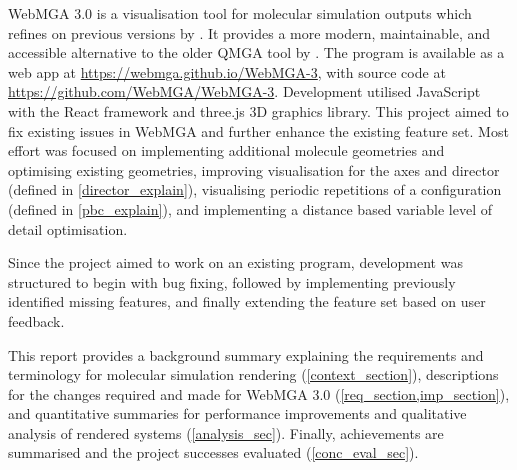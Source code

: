 WebMGA 3.0 is a visualisation tool for molecular simulation outputs which refines on previous versions by \textcite{Battistini_2021,webmga_2}. It provides a more modern, maintainable, and accessible alternative to the older QMGA tool by \textcite{gabriel2008molecular}. The program is available as a web app at \href{https://webmga.github.io/WebMGA-3}{https://webmga.github.io/WebMGA-3}\cite{webmga_3_app}, with source code at \href{https://github.com/WebMGA/WebMGA-3}{https://github.com/WebMGA/WebMGA-3}\cite{webmga_3_github}. Development utilised JavaScript with the React\cite{react} framework and three.js\cite{three} 3D graphics library. This project aimed to fix existing issues in WebMGA and further enhance the existing feature set. Most effort was focused on implementing additional molecule geometries and optimising existing geometries, improving visualisation for the axes and director (defined in \cref{director_explain}), visualising periodic repetitions of a configuration (defined in \cref{pbc_explain}), and implementing a distance based variable level of detail optimisation.

Since the project aimed to work on an existing program, development was structured to begin with bug fixing, followed by implementing previously identified missing features, and finally extending the feature set based on user feedback.

This report provides a background summary explaining the requirements and terminology for molecular simulation rendering (\cref{context_section}), descriptions for the changes required and made for WebMGA 3.0 (\cref{req_section,imp_section}), and quantitative summaries for performance improvements and qualitative analysis of rendered systems (\cref{analysis_sec}). Finally, achievements are summarised and the project successes evaluated (\cref{conc_eval_sec}).

